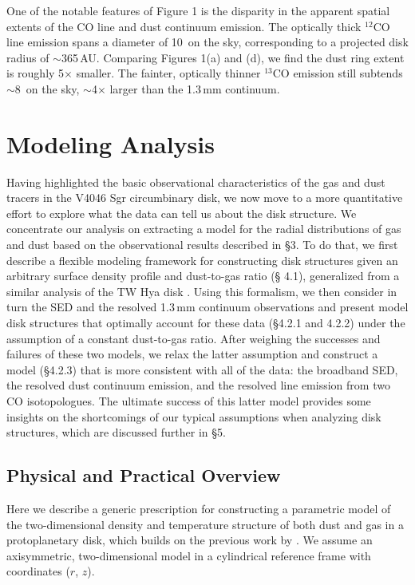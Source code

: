 {One of the notable features of Figure 1 is the disparity in the apparent 
spatial extents of the CO line and dust continuum emission.  The optically thick
$^{12}$CO line emission spans a diameter of 10\arcsec\ on the sky, corresponding
to a projected disk radius of $\sim$365\,AU.  Comparing Figures 1(a) and (d), we
find the dust ring extent is roughly 5$\times$ smaller.  The fainter, optically 
thinner $^{13}$CO emission still subtends $\sim$8\arcsec\ on the sky, 
$\sim$4$\times$ larger than the 1.3\,mm continuum.


\section{Modeling Analysis}

Having highlighted the basic observational characteristics of the gas and dust
tracers in the V4046 Sgr circumbinary disk, we now move to a more quantitative
effort to explore what the data can tell us about the disk structure.  We
concentrate our analysis on extracting a model for the radial distributions of
gas and dust based on the observational results described in \S 3.  To do that,
we first describe a flexible modeling framework for constructing disk 
structures given an arbitrary surface density profile and dust-to-gas ratio (\S
4.1), generalized from a similar analysis of the TW Hya disk 
\citep{andrews12}.  Using this formalism, we then consider in turn the SED 
and the resolved 1.3\,mm continuum observations and present model disk 
structures that optimally account for these data (\S 4.2.1 and 4.2.2) under the 
assumption of a constant dust-to-gas ratio.  After weighing the successes and 
failures of these two models, we relax the latter assumption and construct a 
model (\S 4.2.3) that is more consistent with all of the data: the broadband 
SED, the resolved dust continuum emission, and the resolved line emission from 
two CO isotopologues.  The ultimate success of this latter model provides some
insights on the shortcomings of our typical assumptions when analyzing disk
structures, which are discussed further in \S 5.


\subsection{Physical and Practical Overview}

Here we describe a generic prescription for constructing a parametric model of 
the two-dimensional density and temperature structure of both dust and gas in a 
protoplanetary disk, which builds on the previous work by 
\citet{andrews09,andrews10,andrews11,andrews12}.  We assume an axisymmetric,
two-dimensional model in a cylindrical reference frame with coordinates ($r$,
$z$).

}
